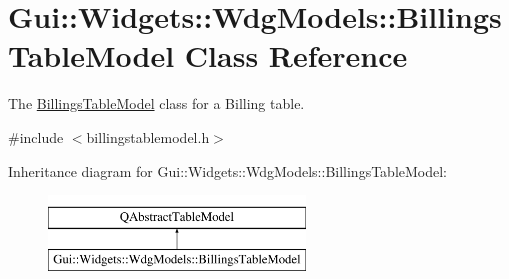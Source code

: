 \hypertarget{classGui_1_1Widgets_1_1WdgModels_1_1BillingsTableModel}{}\section{Gui\+:\+:Widgets\+:\+:Wdg\+Models\+:\+:Billings\+Table\+Model Class Reference}
\label{classGui_1_1Widgets_1_1WdgModels_1_1BillingsTableModel}


The \hyperlink{classGui_1_1Widgets_1_1WdgModels_1_1BillingsTableModel}{Billings\+Table\+Model} class for a Billing table.  




{\ttfamily \#include $<$billingstablemodel.\+h$>$}

Inheritance diagram for Gui\+:\+:Widgets\+:\+:Wdg\+Models\+:\+:Billings\+Table\+Model\+:\begin{figure}[H]
\begin{center}
\leavevmode
\includegraphics[height=2.000000cm]{dc/d82/classGui_1_1Widgets_1_1WdgModels_1_1BillingsTableModel}
\end{center}
\end{figure}
